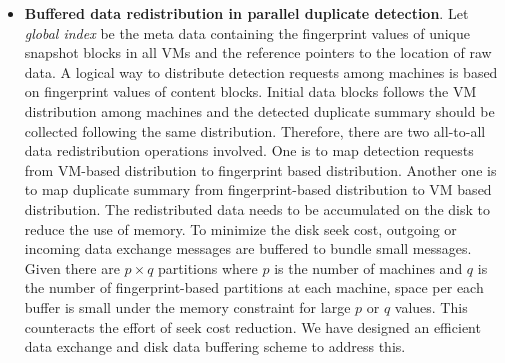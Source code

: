 \begin{itemize}
\item {\bf Buffered data redistribution in parallel duplicate detection}.
Let {\em global index} be the meta data containing the fingerprint values of unique snapshot blocks
in all VMs and  the reference pointers to the location of raw data.
A logical way to distribute detection requests among machines is based on
fingerprint values of content blocks.
Initial data  blocks follows the VM distribution
among machines
and the detected duplicate summary
should be collected following the same distribution.
Therefore, there are two all-to-all data redistribution operations involved.
One is to map detection requests from VM-based distribution to fingerprint based distribution.
Another one  is to map duplicate summary from fingerprint-based distribution to VM based distribution.
The redistributed data needs to be accumulated on the disk to reduce the use of memory.
To minimize the disk seek cost, outgoing or incoming data exchange messages are buffered to
bundle small messages.
Given there are $p\times q$ partitions where $p$ is the number of machines and $q$ is the number of fingerprint-based partitions
at each machine, space per each buffer  is small under the memory constraint for large $p$ or $q$ values.
This counteracts the effort of seek cost reduction.
We have designed an efficient data exchange and disk data buffering  scheme to address this.


\end{itemize}


